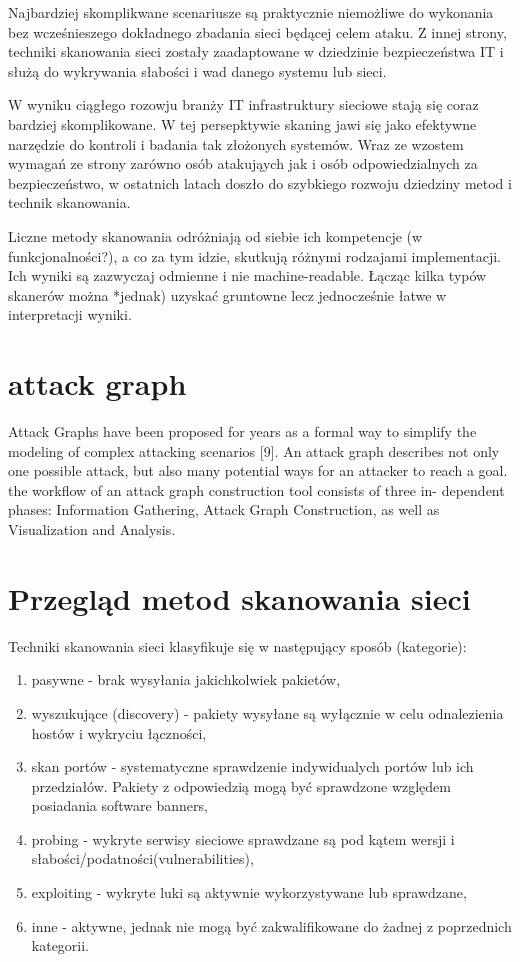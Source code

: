 Najbardziej skomplikwane scenariusze są praktycznie niemożliwe do wykonania bez wcześnieszego dokładnego zbadania sieci będącej celem ataku. Z innej strony, techniki skanowania sieci zostały zaadaptowane w dziedzinie bezpieczeństwa IT i służą do wykrywania słabości i wad danego systemu lub sieci.

W wyniku ciągłego rozowju branży IT infrastruktury sieciowe stają się coraz bardziej skomplikowane. W tej persepktywie skaning jawi się jako efektywne narzędzie do kontroli i badania tak złożonych systemów. Wraz ze wzostem wymagań ze strony zarówno osób atakująych jak i osób odpowiedzialnych za bezpieczeństwo, w ostatnich latach doszło do szybkiego rozwoju dziedziny metod i technik skanowania.

Liczne metody skanowania odróżniają od siebie ich kompetencje (w funkcjonalności?), a co za tym idzie, skutkują różnymi rodzajami implementacji. Ich wyniki są zazwyczaj odmienne i nie machine-readable. Łącząc kilka typów skanerów można *jednak) uzyskać gruntowne lecz jednocześnie łatwe w interpretacji wyniki.


\section{attack graph}

Attack Graphs have been proposed for years as a formal way to simplify the modeling of complex attacking scenarios [9]. An attack graph describes not only one possible attack, but also many potential ways for an attacker to reach a goal. the workflow of an attack graph construction tool consists of three in- dependent phases: Information Gathering, Attack Graph Construction, as well as Visualization and Analysis.

\section{Przegląd metod skanowania sieci}

Techniki skanowania sieci klasyfikuje się w następujący sposób (kategorie):
\begin{enumerate}
	\item pasywne - brak wysyłania jakichkolwiek pakietów,
	\item wyszukujące (discovery) - pakiety wysyłane są wyłącznie w celu odnalezienia hostów i wykryciu łączności,
	\item skan portów - systematyczne sprawdzenie indywidualych portów lub ich przedziałów. Pakiety z odpowiedzią mogą być sprawdzone względem posiadania software banners,
	\item probing - wykryte serwisy sieciowe sprawdzane są pod kątem wersji i słabości/podatności(vulnerabilities),
	\item exploiting - wykryte luki są aktywnie wykorzystywane lub sprawdzane,
	\item inne - aktywne, jednak nie mogą być zakwalifikowane do żadnej z poprzednich kategorii.
\end{enumerate}

